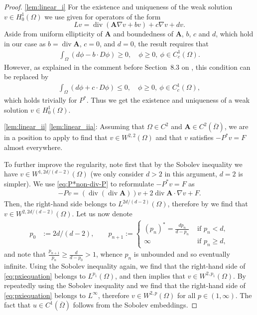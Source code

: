 \documentclass[12pt,a4paper]{amsart}
\theoremstyle{definition}
\newcommand{\A}{\mathbf{A}}
\newcommand*\Div{\operatorname{div}}
\begin{document}
\begin{proof}
     \ref{lem:linear_i} For the existence and uniqueness of the weak solution $v\in H^1_0(\Omega)$ we use \cite[Theorem~8.3]{MR1814364} given for operators of the form
     $$Lv = \Div (\A\nabla v + b v) + c\nabla v + dv.$$ 
    Aside from uniform ellipticity of $\A$ and boundedness of $\A$, $b$, $c$ and $d$, which hold in our case as $b=\Div \A$, $c=0$, and $d=0$, the result requires that
     \begin{align*} %
         \int_\Omega(d\phi - b\cdot D\phi) \geq 0,\quad \phi\geq 0,\ \phi\in C^1_c(\Omega).
     \end{align*}
     However, as explained in the comment before Section~8.3 on \cite[p.~183]{MR1814364}, this condition can be replaced by 
     \begin{align*} %
         \int_\Omega (d\phi + c\cdot D\phi) \leq 0,\quad \phi\geq 0,\ \phi\in C^1_c(\Omega),
     \end{align*}
     which holds trivially for $P^*$. Thus we get the existence and uniqueness of a weak solution $v\in H^1_0(\Omega)$. \medskip

     \noindent \ref{lem:linear_ii} \ref{lem:linear_iia}:
    Assuming that $\Omega \in C^2$ and $\A\in C^2(\overline{\Omega})$, we are in a position to apply \cite[Theorems~8.8 and 8.12]{MR1814364} to find that $v\in W^{2,2}(\Omega)$ and that $v$ satisfies $-P^*v = F$ almost everywhere.

    To further improve the regularity, note first that by the Sobolev inequality we have $v \in W^{1,2d/(d-2)}(\Omega)$ (we only consider $d>2$ in this argument, $d=2$ is simpler). We use \eqref{eq:P*non-div-P} to reformulate $-P^*v = F$ as
    \begin{align}\label{eq:pxiequation}
       -Pv = (\Div(\Div \A)) v + 2\Div \A \cdot \nabla v + F.
    \end{align}
    Then, the right-hand side belongs to $L^{2d/(d-2)}(\Omega)$, therefore by \cite[Theorem~9.15]{MR1814364} we find that $v \in W^{2,2d/(d-2)}(\Omega)$. Let us now denote 
    \begin{align*}
        p_0 &:= 2d/(d-2), \qquad
        p_{n+1} := \begin{cases}
            (p_n)^*= \frac{dp_n}{d-p_n} &\text{ if } p_n < d, \\
            \infty &\text{ if } p_n \geq d,
        \end{cases}
    \end{align*}
    and note that $\frac{p_{n+1}}{p_n} \geq \frac{d}{d - p_0} > 1$, whence $p_n$ is unbounded and so eventually infinite. Using the Sobolev inequality again, we find that the right-hand side of \eqref{eq:pxiequation} belongs to $L^{p_1}(\Omega)$, and then \cite[Theorem~9.15]{MR1814364} implies that $v \in W^{2,p_1}(\Omega)$. By repeatedly using the Sobolev inequality and \cite[Theorem~9.15]{MR1814364} we find that the right-hand side of \eqref{eq:pxiequation}
    belongs to $L^\infty$, 
    therefore $v \in W^{2,p}(\Omega)$ for all $p\in (1,\infty)$. The fact that $u\in C^1(\overline{\Omega})$ follows from the Sobolev embeddings. \medskip
    

\end{proof}
\end{document}
